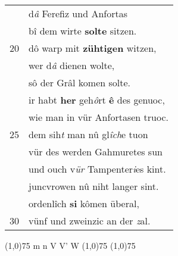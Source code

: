 \documentclass[8pt,a4paper,notitlepage]{article}
\begin{document}
\begin{table}[ht]
\begin{minipage}[t]{0.5\linewidth}
\begin{tabular}{rl}
 & d\textit{â} Ferefiz und Anfortas\\ 
 & bî dem wirte \textbf{solte} sitzen.\\ 
20 & dô warp mit \textbf{zühtigen} witzen,\\ 
 & wer d\textit{â} dienen wolte,\\ 
 & sô der Grâl komen solte.\\ 
 & ir habt \textbf{her} geh\textit{ô}rt \textbf{ê} des genuoc,\\ 
 & wie man in vür Anfortasen truoc.\\ 
25 & dem sih\textit{t} man nû gl\textit{îch}e tuon\\ 
 & vür des werden Gahmuretes sun\\ 
 & und ouch v\textit{ür} Tampenter\textit{i}es kint.\\ 
 & juncvrowen nû niht langer sint.\\ 
 & ordenlîch \textbf{si} kômen überal,\\ 
30 & vünf und zweinzic an der \textit{z}al.\\ 
\end{tabular}
\scriptsize
\line(1,0){75} \newline
m n V V' W \newline
\line(1,0){75} \newline
\newline
\line(1,0){75} \newline

\end{minipage}
\end{table}
\end{document}
